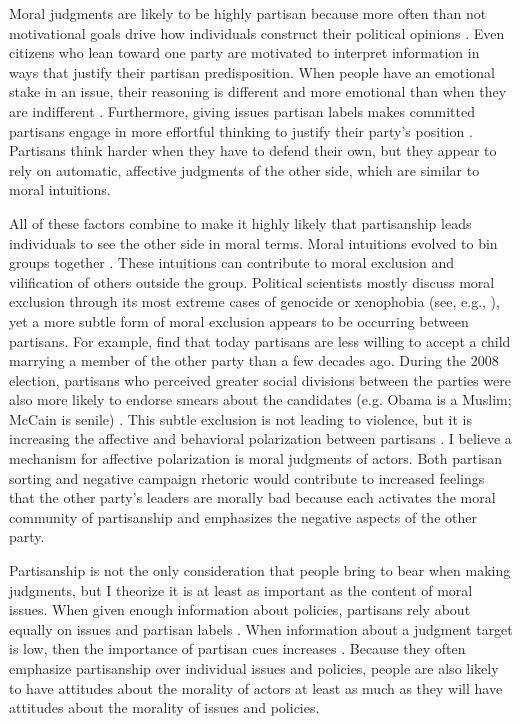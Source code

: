 Moral judgments are likely to be highly partisan because more often than not motivational goals drive how individuals construct their political opinions \cite{TaberLodgeGlathar2001}. Even citizens who lean toward one party are motivated to interpret information in ways that justify their partisan predisposition. When people have an emotional stake in an issue, their reasoning is different and more emotional than when they are indifferent \cite{Westenetal2006}. Furthermore, giving issues partisan labels makes committed partisans engage in more effortful thinking to justify their party's position \cite{Petersenetal2013}. Partisans think harder when they have to defend their own, but they appear to rely on automatic, affective judgments of the other side, which are similar to moral intuitions.

All of these factors combine to make it highly likely that partisanship leads individuals to see the other side in moral terms. Moral intuitions evolved to bin groups together \cite{Haidt2012}. These intuitions can contribute to moral exclusion and vilification of others outside the group. Political scientists mostly discuss moral exclusion through its most extreme cases of genocide or xenophobia (see, e.g., ), yet a more subtle form of moral exclusion appears to be occurring between partisans. For example,  find that today partisans are less willing to accept a child marrying a member of the other party than a few decades ago. During the 2008 election, partisans who perceived greater social divisions between the parties were also more likely to endorse smears about the candidates (e.g. Obama is a Muslim; McCain is senile) \cite{Kosloffetal2010}. This subtle exclusion is not leading to violence, but it is increasing the affective and behavioral polarization between partisans \cite{Iyengaretal2012,MasonForthcoming}. I believe a mechanism for affective polarization is moral judgments of actors. Both partisan sorting and negative campaign rhetoric would contribute to increased feelings that the other party's leaders are morally bad because each activates the moral community of partisanship and emphasizes the negative aspects of the other party.

Partisanship is not the only consideration that people bring to bear when making judgments, but I theorize it is at least as important as the content of moral issues. When given enough information about policies, partisans rely about equally on issues and partisan labels \cite{Bullock2011}. When information about a judgment target is low, then the importance of partisan cues increases \cite{Cohen2003,Kam2005}. Because they often emphasize partisanship over individual issues and policies, people are also likely to have attitudes about the morality of actors at least as much as they will have attitudes about the morality of issues and policies.

